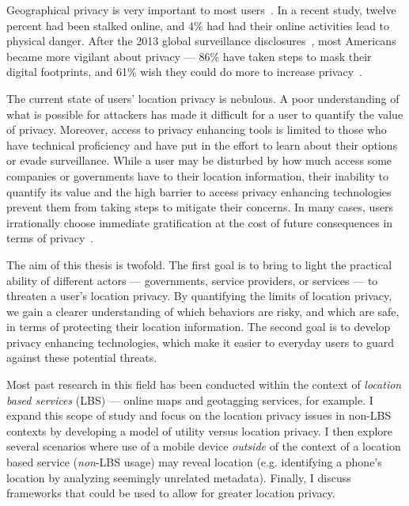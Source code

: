 
Geographical privacy is very important to most users~\cite{Pew1}. 
In a recent study, twelve percent had been stalked online, and 4\% had had their online activities lead to physical danger. After the 2013 global surveillance disclosures~\cite{greenwald2013boundless}, most Americans became more vigilant about privacy --- 86\% have taken steps to mask their digital footprints, and 61\% wish they could do more to increase privacy~\cite{Pew2}.

The current state of users' location privacy is nebulous. A poor understanding of what is possible for attackers has made it difficult for a user to quantify the value of privacy. Moreover, access to privacy enhancing tools is limited to those who have technical proficiency and have put in the effort to learn about their options or evade surveillance. While a user may be disturbed by how much access some companies or governments have to their location information, their inability to quantify its value and the high barrier to access privacy enhancing technologies prevent them from taking steps to mitigate their concerns. In many cases, users irrationally choose immediate gratification at the cost of future consequences in terms of privacy~\cite{acquisti2004privacy}.

The aim of this thesis is twofold. The first goal is to bring to light the practical ability of different actors --- governments, service providers, or services --- to threaten a user's location privacy. By quantifying the limits of location privacy, we gain a clearer understanding of which behaviors are risky, and which are safe, in terms of protecting their location information. The second goal is to develop privacy enhancing technologies, which make it easier to everyday users to guard against these potential threats.

Most past research in this field has been conducted within the context of \emph{location based services} (LBS) --- online maps and geotagging services, for example. I expand this scope of study and focus on the location privacy issues in non-LBS contexts by developing a model of utility versus location privacy. I then explore several scenarios where use of a mobile device \emph{outside} of the context of a location based service (\emph{non}-LBS usage) may reveal location (e.g. identifying a phone's location by analyzing seemingly unrelated metadata). Finally, I discuss frameworks that could be used to allow for greater location privacy.

